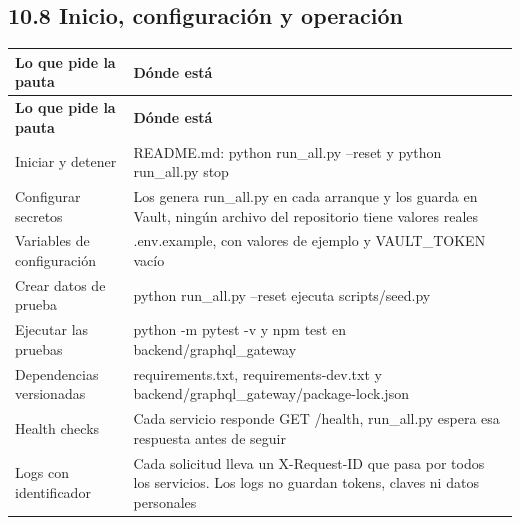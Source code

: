 \documentclass[10pt,letterpaper]{article}
\begin{document}
\subsection*{10.8 Inicio, configuración y operación}
{\footnotesize
\begin{longtable}{|P{\tabcolsep\relax}|P{\tabcolsep\relax}|}
\hline
\textbf{Lo que pide la pauta} & \textbf{Dónde está} \\ \hline
\endfirsthead
\hline
\textbf{Lo que pide la pauta} & \textbf{Dónde está} \\ \hline
\endhead
Iniciar y detener & README.\allowbreak{}md: python run\_\allowbreak{}all.\allowbreak{}py --reset y python run\_\allowbreak{}all.\allowbreak{}py stop \\ \hline
Configurar secretos & Los genera run\_\allowbreak{}all.\allowbreak{}py en cada arranque y los guarda en Vault, ningún archivo del repositorio tiene valores reales \\ \hline
Variables de configuración & .env.\allowbreak{}example, con valores de ejemplo y VAULT\_\allowbreak{}TOKEN vacío \\ \hline
Crear datos de prueba & python run\_\allowbreak{}all.\allowbreak{}py --reset ejecuta scripts/\allowbreak{}seed.\allowbreak{}py \\ \hline
Ejecutar las pruebas & python -m pytest -v y npm test en backend/\allowbreak{}graphql\_\allowbreak{}gateway \\ \hline
Dependencias versionadas & requirements.\allowbreak{}txt, requirements-dev.\allowbreak{}txt y backend/\allowbreak{}graphql\_\allowbreak{}gateway/\allowbreak{}package-lock.\allowbreak{}json \\ \hline
Health checks & Cada servicio responde GET /\allowbreak{}health,  run\_\allowbreak{}all.\allowbreak{}py espera esa respuesta antes de seguir \\ \hline
Logs con identificador & Cada solicitud lleva un X-Request-ID que pasa por todos los servicios. Los logs no guardan tokens, claves ni datos personales  \\ \hline
\end{longtable}}
\end{document}
